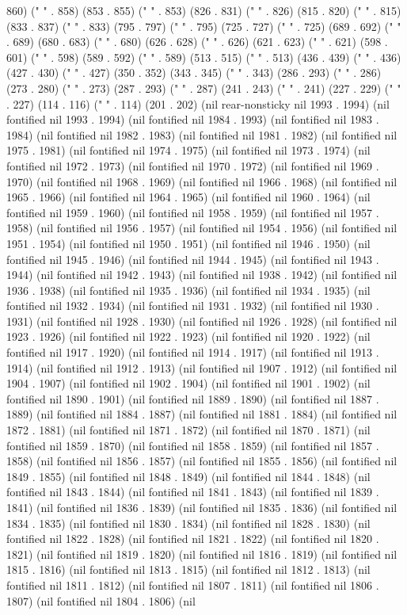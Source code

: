 860) (" " . 858) (853 . 855) (" " . 853) (826 . 831) ("    " . 826) (815 . 820) ("    " . 815) (833 . 837) ("   " . 833) (795 . 797) (" " . 795) (725 . 727) (" " . 725) (689 . 692) ("    " . 689) (680 . 683) ("    " . 680) (626 . 628) ("   " . 626) (621 . 623) (" " . 621) (598 . 601) ("     " . 598) (589 . 592) ("     " . 589) (513 . 515) ("   " . 513) (436 . 439) ("     " . 436) (427 . 430) ("     " . 427) (350 . 352) (343 . 345) (" " . 343) (286 . 293) ("  " . 286) (273 . 280) ("  " . 273) (287 . 293) ("  " . 287) (241 . 243) (" " . 241) (227 . 229) (" " . 227) (114 . 116) (" " . 114) (201 . 202) (nil rear-nonsticky nil 1993 . 1994) (nil fontified nil 1993 . 1994) (nil fontified nil 1984 . 1993) (nil fontified nil 1983 . 1984) (nil fontified nil 1982 . 1983) (nil fontified nil 1981 . 1982) (nil fontified nil 1975 . 1981) (nil fontified nil 1974 . 1975) (nil fontified nil 1973 . 1974) (nil fontified nil 1972 . 1973) (nil fontified nil 1970 . 1972) (nil fontified nil 1969 . 1970) (nil fontified nil 1968 . 1969) (nil fontified nil 1966 . 1968) (nil fontified nil 1965 . 1966) (nil fontified nil 1964 . 1965) (nil fontified nil 1960 . 1964) (nil fontified nil 1959 . 1960) (nil fontified nil 1958 . 1959) (nil fontified nil 1957 . 1958) (nil fontified nil 1956 . 1957) (nil fontified nil 1954 . 1956) (nil fontified nil 1951 . 1954) (nil fontified nil 1950 . 1951) (nil fontified nil 1946 . 1950) (nil fontified nil 1945 . 1946) (nil fontified nil 1944 . 1945) (nil fontified nil 1943 . 1944) (nil fontified nil 1942 . 1943) (nil fontified nil 1938 . 1942) (nil fontified nil 1936 . 1938) (nil fontified nil 1935 . 1936) (nil fontified nil 1934 . 1935) (nil fontified nil 1932 . 1934) (nil fontified nil 1931 . 1932) (nil fontified nil 1930 . 1931) (nil fontified nil 1928 . 1930) (nil fontified nil 1926 . 1928) (nil fontified nil 1923 . 1926) (nil fontified nil 1922 . 1923) (nil fontified nil 1920 . 1922) (nil fontified nil 1917 . 1920) (nil fontified nil 1914 . 1917) (nil fontified nil 1913 . 1914) (nil fontified nil 1912 . 1913) (nil fontified nil 1907 . 1912) (nil fontified nil 1904 . 1907) (nil fontified nil 1902 . 1904) (nil fontified nil 1901 . 1902) (nil fontified nil 1890 . 1901) (nil fontified nil 1889 . 1890) (nil fontified nil 1887 . 1889) (nil fontified nil 1884 . 1887) (nil fontified nil 1881 . 1884) (nil fontified nil 1872 . 1881) (nil fontified nil 1871 . 1872) (nil fontified nil 1870 . 1871) (nil fontified nil 1859 . 1870) (nil fontified nil 1858 . 1859) (nil fontified nil 1857 . 1858) (nil fontified nil 1856 . 1857) (nil fontified nil 1855 . 1856) (nil fontified nil 1849 . 1855) (nil fontified nil 1848 . 1849) (nil fontified nil 1844 . 1848) (nil fontified nil 1843 . 1844) (nil fontified nil 1841 . 1843) (nil fontified nil 1839 . 1841) (nil fontified nil 1836 . 1839) (nil fontified nil 1835 . 1836) (nil fontified nil 1834 . 1835) (nil fontified nil 1830 . 1834) (nil fontified nil 1828 . 1830) (nil fontified nil 1822 . 1828) (nil fontified nil 1821 . 1822) (nil fontified nil 1820 . 1821) (nil fontified nil 1819 . 1820) (nil fontified nil 1816 . 1819) (nil fontified nil 1815 . 1816) (nil fontified nil 1813 . 1815) (nil fontified nil 1812 . 1813) (nil fontified nil 1811 . 1812) (nil fontified nil 1807 . 1811) (nil fontified nil 1806 . 1807) (nil fontified nil 1804 . 1806) (nil 